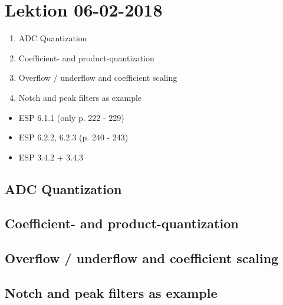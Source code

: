 \section{Lektion 06-02-2018}

\begin{enumerate}
	\item ADC Quantization
	\item Coefficient- and product-quantization
	\item Overflow / underflow and coefficient scaling
	\item Notch and peak filters as example
\end{enumerate}

\begin{mdframed}[style=exampledefault]
\begin{itemize}
	\item ESP 6.1.1 (only p. 222 - 229)
	\item ESP 6.2.2, 6.2.3 (p. 240 - 243)
	\item ESP 3.4.2 + 3.4,3
\end{itemize}
\end{mdframed}

\subsection{ADC Quantization}

\subsection{Coefficient- and product-quantization}

\subsection{Overflow / underflow and coefficient scaling}

\subsection{Notch and peak filters as example}